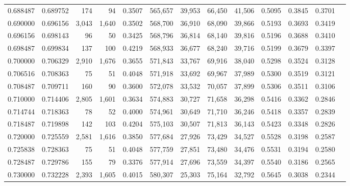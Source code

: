 \begin{tabular}{rrrrrrrrrrrrr}
0.688487 & 0.689752 &    174 &    94 &                                     0.3507 & 565,657 &  39,953 &  66,450 &  41,506 & 0.5095 & 0.3845 & 0.3701 \\
0.690000 & 0.696156 &  3,043 & 1,640 &                                     0.3502 & 568,700 &  36,910 &  68,090 &  39,866 & 0.5193 & 0.3693 & 0.3419 \\
0.696156 & 0.698143 &     96 &    50 &                                     0.3425 & 568,796 &  36,814 &  68,140 &  39,816 & 0.5196 & 0.3688 & 0.3410 \\
0.698487 & 0.699834 &    137 &   100 &                                     0.4219 & 568,933 &  36,677 &  68,240 &  39,716 & 0.5199 & 0.3679 & 0.3397 \\
0.700000 & 0.706329 &  2,910 & 1,676 &                                     0.3655 & 571,843 &  33,767 &  69,916 &  38,040 & 0.5298 & 0.3524 & 0.3128 \\
0.706516 & 0.708363 &     75 &    51 &                                     0.4048 & 571,918 &  33,692 &  69,967 &  37,989 & 0.5300 & 0.3519 & 0.3121 \\
0.708487 & 0.709711 &    160 &    90 &                                     0.3600 & 572,078 &  33,532 &  70,057 &  37,899 & 0.5306 & 0.3511 & 0.3106 \\
0.710000 & 0.714406 &  2,805 & 1,601 &                                     0.3634 & 574,883 &  30,727 &  71,658 &  36,298 & 0.5416 & 0.3362 & 0.2846 \\
0.714744 & 0.718363 &     78 &    52 &                                     0.4000 & 574,961 &  30,649 &  71,710 &  36,246 & 0.5418 & 0.3357 & 0.2839 \\
0.718487 & 0.719898 &    142 &   103 &                                     0.4204 & 575,103 &  30,507 &  71,813 &  36,143 & 0.5423 & 0.3348 & 0.2826 \\
0.720000 & 0.725559 &  2,581 & 1,616 &                                     0.3850 & 577,684 &  27,926 &  73,429 &  34,527 & 0.5528 & 0.3198 & 0.2587 \\
0.725838 & 0.728363 &     75 &    51 &                                     0.4048 & 577,759 &  27,851 &  73,480 &  34,476 & 0.5531 & 0.3194 & 0.2580 \\
0.728487 & 0.729786 &    155 &    79 &                                     0.3376 & 577,914 &  27,696 &  73,559 &  34,397 & 0.5540 & 0.3186 & 0.2565 \\
0.730000 & 0.732228 &  2,393 & 1,605 &                                     0.4015 & 580,307 &  25,303 &  75,164 &  32,792 & 0.5645 & 0.3038 & 0.2344 \\

\end{tabular}

